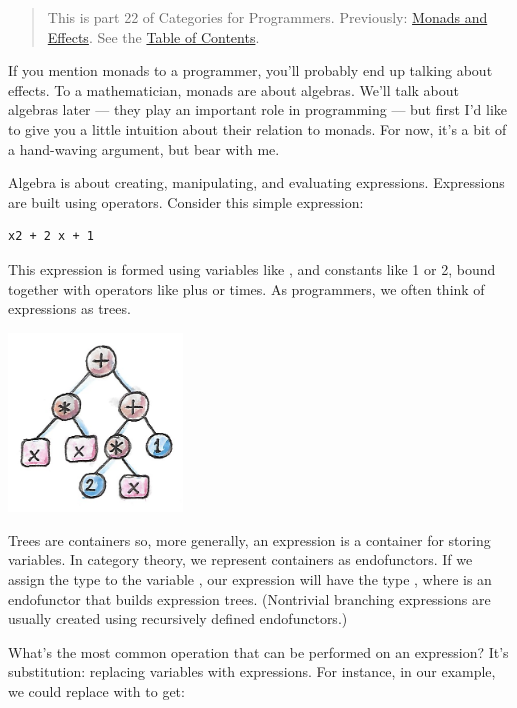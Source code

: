 \begin{quote}
This is part 22 of Categories for Programmers. Previously:
\href{https://bartoszmilewski.com/2016/11/30/monads-and-effects/}{Monads
and Effects}. See the
\href{https://bartoszmilewski.com/2014/10/28/category-theory-for-programmers-the-preface/}{Table
of Contents}.
\end{quote}

If you mention monads to a programmer, you'll probably end up talking
about effects. To a mathematician, monads are about algebras. We'll talk
about algebras later --- they play an important role in programming ---
but first I'd like to give you a little intuition about their relation
to monads. For now, it's a bit of a hand-waving argument, but bear with
me.

Algebra is about creating, manipulating, and evaluating expressions.
Expressions are built using operators. Consider this simple expression:

\begin{verbatim}
x2 + 2 x + 1
\end{verbatim}

This expression is formed using variables like , and constants
like 1 or 2, bound together with operators like plus or times. As
programmers, we often think of expressions as trees.

\includegraphics[width=1.82292in]{images/exptree.png}

Trees are containers so, more generally, an expression is a container
for storing variables. In category theory, we represent containers as
endofunctors. If we assign the type  to the variable
, our expression will have the type , where
 is an endofunctor that builds expression trees. (Nontrivial
branching expressions are usually created using recursively defined
endofunctors.)

What's the most common operation that can be performed on an expression?
It's substitution: replacing variables with expressions. For instance,
in our example, we could replace  with  to
get:


